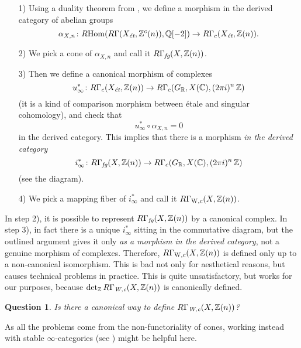 \documentclass{article}
\theoremstyle{plain}
\newtheorem*{question*}{Question}
\begin{document}
\begin{enumerate}
\item[1)] Using a duality theorem from \cite{Geisser-10}, we define a morphism
  in the derived category of abelian groups
  \[ \alpha_{X,n}\colon R\!\operatorname{Hom} (R\Gamma (X_\text{\it ét}, \mathbb{Z}^c (n)), \mathbb{Q} [-2]) \to
    R\Gamma_c (X_\text{\it ét}, \mathbb{Z} (n)). \]

\item[2)] We pick a cone of $\alpha_{X,n}$ and call it
  $R\Gamma_\text{\it fg} (X, \mathbb{Z} (n))$.

\item[3)] Then we define a canonical morphism of complexes
  \[ u_\infty^*\colon R\Gamma_c (X_\text{\it ét}, \mathbb{Z} (n)) \to
    R\Gamma_c (G_{\mathbb{R}}, X (\mathbb{C}), (2\pi i)^n\,\mathbb{Z}) \]
  (it is a kind of comparison morphism between étale and singular cohomology),
  and check that
  $$u_\infty^*\circ \alpha_{X,n} = 0$$
  in the derived category. This implies that there is a morphism
  \emph{in the derived category}
  \[ i_\infty^*\colon R\Gamma_\text{\it fg} (X, \mathbb{Z} (n)) \to
    R\Gamma_c (G_{\mathbb{R}}, X (\mathbb{C}), (2\pi i)^n\,\mathbb{Z}) \]
  (see the diagram).

\item[4)] We pick a mapping fiber of $i_\infty^*$ and call it
  $R\Gamma_{\text W,c} (X,\mathbb{Z} (n))$.
\end{enumerate}

In step 2), it is possible to represent $R\Gamma_\text{\it fg} (X, \mathbb{Z} (n))$ by
a canonical complex. In step 3), in fact there is a unique $i_\infty^*$ sitting
in the commutative diagram, but the outlined argument gives it only
\emph{as a morphism in the derived category}, not a genuine morphism of
complexes. Therefore, $R\Gamma_{\text W,c} (X,\mathbb{Z} (n))$ is defined only up to
a non-canonical isomorphism. This is bad not only for aesthetical reasons, but
causes technical problems in practice. This is quite unsatisfactory, but works
for our purposes, because $\det\nolimits_{\mathbb{Z}} R\Gamma_\text{\it W,c} (X,\mathbb{Z}(n))$
is canonically defined.

\begin{question*}
  Is there a canonical way to define $R\Gamma_\text{\it W,c} (X,\mathbb{Z}(n))$?
\end{question*}

As all the problems come from the non-functoriality of cones, working instead
with stable $\infty$-categories (see \cite{Lurie-DAG-1}) might be helpful here.

\vspace{1em}
\end{document}
